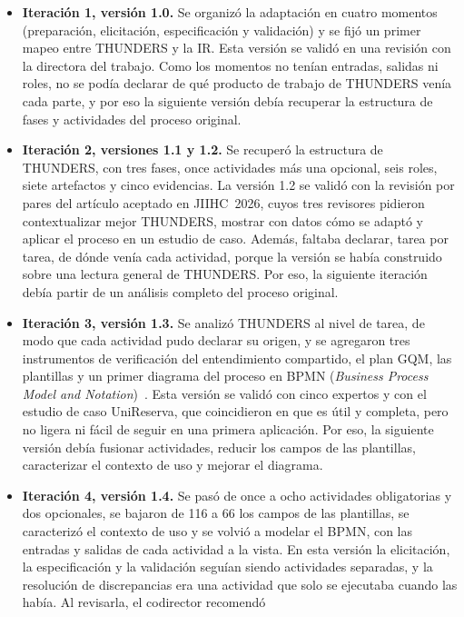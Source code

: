 \documentclass[12pt,letterpaper,oneside]{report}
\begin{document}
\begin{itemize}
\item \textbf{Iteración 1, versión 1.0.} Se organizó la adaptación en cuatro
  momentos (preparación, elicitación, especificación y validación) y se fijó un
  primer mapeo entre THUNDERS y la IR. Esta versión se validó en una revisión
  con la directora del trabajo. Como los momentos no tenían entradas, salidas ni
  roles, no se podía declarar de qué producto de trabajo de THUNDERS venía cada parte, y
  por eso la siguiente versión debía recuperar la estructura de fases y
  actividades del proceso original.
\item \textbf{Iteración 2, versiones 1.1 y 1.2.} Se recuperó la estructura de
  THUNDERS, con tres fases, once actividades más una opcional, seis roles, siete
  artefactos y cinco evidencias. La versión 1.2 se validó con la revisión por
  pares del artículo aceptado en JIIHC~2026, cuyos tres revisores pidieron
  contextualizar mejor THUNDERS, mostrar con datos cómo se adaptó y aplicar el
  proceso en un estudio de caso. Además, faltaba declarar, tarea por tarea, de
  dónde venía cada actividad, porque la versión se había construido sobre una
  lectura general de THUNDERS. Por eso, la siguiente iteración debía partir de un
  análisis completo del proceso original.
\item \textbf{Iteración 3, versión 1.3.} Se analizó THUNDERS al nivel de tarea,
  de modo que cada actividad pudo declarar su origen, y se agregaron tres
  instrumentos de verificación del entendimiento compartido, el plan GQM, las
  plantillas y un primer diagrama del proceso en BPMN (\textit{Business Process
  Model and Notation})~\cite{omg2011bpmn}. Esta versión se validó con cinco expertos y con el estudio de caso
  UniReserva, que coincidieron en que es útil y completa, pero no ligera ni fácil
  de seguir en una primera aplicación. Por eso, la siguiente versión debía
  fusionar actividades, reducir los campos de las plantillas, caracterizar el
  contexto de uso y mejorar el diagrama.
\item \textbf{Iteración 4, versión 1.4.} Se pasó de once a ocho actividades
  obligatorias y dos opcionales, se bajaron de 116 a 66 los campos de las
  plantillas, se caracterizó el contexto de uso y se volvió a modelar el BPMN,
  con las entradas y salidas de cada actividad a la vista. En esta
  versión la elicitación, la especificación y la validación seguían siendo
  actividades separadas, y la resolución de discrepancias era una actividad que
  solo se ejecutaba cuando las había. Al revisarla, el codirector recomendó

\end{itemize}
\end{document}
